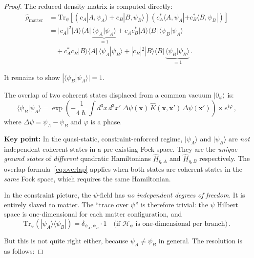 \documentclass[12pt,a4paper]{article}
\theoremstyle{definition}
\theoremstyle{remark}
\newcommand{\hbar}{\hslash}
\newcommand{\Tr}{\mathrm{Tr}}
\newcommand{\Hilb}{\mathcal{H}}
\begin{document}
\begin{proof}
The reduced density matrix is computed directly:
\begin{align}
\hat{\rho}_{\mathrm{matter}} &= \Tr_\psi\!\left[
\left(c_A|A,\psi_A\rangle + c_B|B,\psi_B\rangle\right)
\left(c_A^*\langle A,\psi_A| + c_B^*\langle B,\psi_B|\right)
\right] \nonumber\\
&= |c_A|^2 |A\rangle\langle A|\,\underbrace{\langle\psi_A|\psi_A\rangle}_{=1}
+ c_A c_B^* |A\rangle\langle B|\,\langle\psi_B|\psi_A\rangle \nonumber\\
&\quad + c_A^* c_B |B\rangle\langle A|\,\langle\psi_A|\psi_B\rangle
+ |c_B|^2 |B\rangle\langle B|\,\underbrace{\langle\psi_B|\psi_B\rangle}_{=1}\,.
\end{align}

It remains to show $|\langle\psi_B|\psi_A\rangle| = 1$.

The overlap of two coherent states displaced from a common vacuum $|0_\psi\rangle$ is:
\begin{equation}
\label{eq:overlap}
\langle\psi_B|\psi_A\rangle = \exp\!\left(
-\frac{1}{4\hbar}\int d^3x\,d^3x'\;
\Delta\psi(\mathbf{x})\,\hat{K}(\mathbf{x},\mathbf{x}')\,\Delta\psi(\mathbf{x}')
\right) \times e^{i\varphi}\,,
\end{equation}
where $\Delta\psi = \psi_A - \psi_B$ and $\varphi$ is a phase.

\textbf{Key point:} In the quasi-static, constraint-enforced regime, $|\psi_A\rangle$
and $|\psi_B\rangle$ are \emph{not} independent coherent states in a pre-existing
Fock space.  They are the \emph{unique ground states} of \emph{different}
quadratic Hamiltonians $\hat{H}_{\eta,A}$ and $\hat{H}_{\eta,B}$ respectively.
The overlap formula~\eqref{eq:overlap} applies when both states are coherent
states in the \emph{same} Fock space, which requires the same Hamiltonian.

In the constraint picture, the $\psi$-field has \emph{no independent degrees of
freedom}.  It is entirely slaved to matter.  The ``trace over $\psi$'' is
therefore trivial: the $\psi$ Hilbert space is one-dimensional for each
matter configuration, and
\begin{equation}
\Tr_\psi(|\psi_A\rangle\langle\psi_B|) = \delta_{\psi_A,\psi_B} \cdot 1
\quad\text{(if $\Hilb_\psi$ is one-dimensional per branch)}\,.
\end{equation}

But this is not quite right either, because $\psi_A \neq \psi_B$ in general.
The resolution is as follows:


\end{proof}
\end{document}
